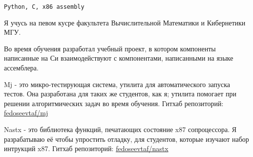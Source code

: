 


\begin{titlepage}

\BgThispage




\begin{centering}
\texttt{Python, C, x86 assembly}

\end{centering}



Я учусь на певом кусре факультета Вычислительной Математики и
Кибернетики МГУ.

Во время обучения разработал учебный проект, в котором
компоненты написанные на Си взаимодействуют с компонентами,
написанными на языке ассемблера.


Mj - это микро-тестирующая система, утилита для автоматического
запуска тестов. Она разработана для таких же студентов, как я;
утилита помогает при решении алгоритмических задач во время обучения.
Гитхаб репозиторий:
\href{https://github.com/fedoseevtaf/mj}{fedoseevtaf/mj}

Nastx - это библиотека функций, печатающих состояние x87
сопроцессора. Я разрабатываю её чтобы упростить отладку,
для студентов, которые изучают набор интрукций x87.
Гитхаб репозиторий:
\href{https://github.com/fedoseevtaf/nastx}{fedoseevtaf/nastx}

\clearpage
\end{titlepage}



